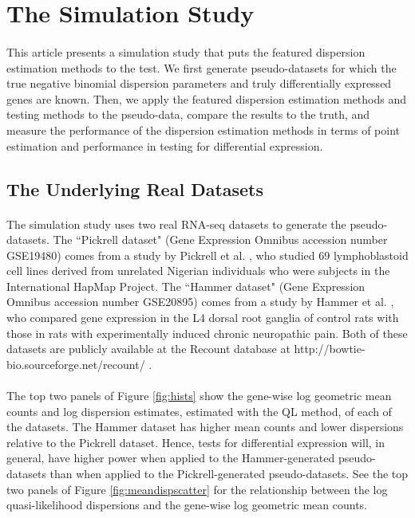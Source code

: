 \documentclass[10pt]{article}
\begin{document}
\section*{The Simulation Study}

\paragraph{} \indent This article presents a simulation study that puts the featured dispersion estimation methods to the test. We first generate pseudo-datasets for which the true negative binomial dispersion parameters and truly differentially expressed genes are known. Then, we apply the featured dispersion estimation methods and testing methods to the pseudo-data, compare the results to the truth, and measure the performance of the dispersion estimation methods in terms of point estimation and performance in testing for differential expression. %

\subsection*{The Underlying Real Datasets} \label{sec:thisdata}

\paragraph{} \indent The simulation study uses two real RNA-seq datasets to generate the pseudo-datasets. The ``Pickrell dataset" (Gene Expression Omnibus accession number GSE19480) comes from a study by Pickrell et al. \cite{pickrell}, who studied 69 lymphoblastoid cell lines derived from unrelated Nigerian individuals who were subjects in the International HapMap Project. The ``Hammer dataset" (Gene Expression Omnibus accession number GSE20895) comes from a study by Hammer et al. \cite{hammer}, who compared gene expression in the L4 dorsal root ganglia of control rats with those in rats with experimentally induced chronic neuropathic pain. Both of these datasets are publicly available at the Recount database at {http://bowtie-bio.sourceforge.net/recount/} \cite{recount}.

\paragraph{} \indent The top two panels of Figure \ref{fig:hists} show the gene-wise log geometric mean counts and log dispersion estimates, estimated with the QL method, of each of the datasets. The Hammer dataset has higher mean counts and lower dispersions relative to the Pickrell dataset. Hence, tests for differential expression will, in general, have higher power when applied to the Hammer-generated pseudo-datasets than when applied to the Pickrell-generated pseudo-datasets. See the top two panels of Figure \ref{fig:meandispscatter} for the relationship between the log quasi-likelihood dispersions and the gene-wise log geometric mean counts.
\end{document}
